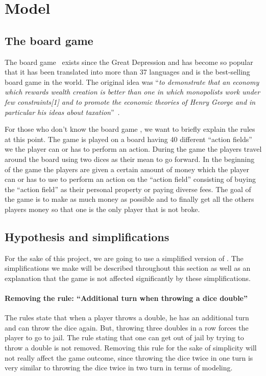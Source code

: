 \section{Model} %
\label{sec:model}

\subsection{The board game} %
\label{sub:the_board_game}
The board game \monopoly~exists since the Great Depression and has
become so popular that it has been translated into more than 37
languages and is the best-selling board game in the world.
The original idea was \enquote{\textit{to demonstrate that an economy which
rewards wealth creation is better than one in which monopolists work
under few constraints[1] and to promote the economic theories of Henry
George and in particular his ideas about taxation}}~\cite{wiki:monopoly}.

For those who don't know the board game \monopoly, we want to briefly 
explain the rules at this point. 
The game is played on a board having 40 different ``action fields'' we the player 
can or has to perform an action. During the game the players travel around the board using 
two dices as their mean to go forward. 
In the  beginning of the game the players are given a certain amount of money which the player 
can or has to use to perform an action on the ``action field'' consisting of buying the ``action field''
as their personal property or paying diverse fees. 
The goal of the game is to make as much money as possible and to finally get all the others players money
so that one is the only player that is not broke. 

\subsection{Hypothesis and simplifications} %
\label{sub:hypothesis_and_simplifications}
For the sake of this project, we are going to use a simplified
version of \monopoly. The simplifications we make will be described throughout
this section as well as an explanation that the game is not affected significantly by 
these simplifications.

\paragraph{Removing the rule: ``Additional turn when throwing a dice double''} %
\label{par:removing_special_rules_with_doubles}
The rules state that when a player throws a double, he has an additional turn and can throw the dice 
again. But, throwing three doubles in a row forces the player to go to jail.
The rule stating that one can get out of jail by trying to throw a double is not removed.
Removing this rule for the sake of simplicity will not really affect the game outcome, since
throwing the dice twice in one turn is very similar to throwing the dice twice in two turn in 
terms of modeling.


